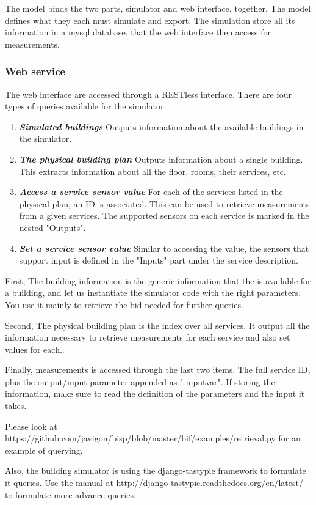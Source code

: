 \documentclass[10pt]{article}
\newcommand{\textdesc}[1]{\textit{\textbf{#1}}} %
\newcommand{\descitem}[1]{\item \textdesc{#1}}
\begin{document}
The model binds the two parts, simulator and web interface, together. The model defines what they
each must simulate and export. The simulation store all its information in a mysql database, that
the web interface then access for measurements. 

\subsubsection{Web service}

The web interface are accessed through a RESTless interface. There are four types of queries available for the simulator:

\begin{enumerate}
				\descitem{Simulated buildings} Outputs information about the available buildings in
				the simulator.
				\descitem{The physical building plan} Outputs information about a single building.
				This extracts information about all the floor, rooms, their services, etc. 
				\descitem{Access a service sensor value} For each of the services listed in the
				physical plan, an ID is associated. This can be used to retrieve measurements from a
				given services. The supported sensors on each service is marked in the nested
				"Outputs".
				\descitem{Set a service sensor value} Similar to accessing the value, the sensors
				that support input is defined in the "Inputs" part under the service description.
\end{enumerate}

First, The building information is the generic information that the is available for a building, and let us
instantiate the simulator code with the right parameters. You use it mainly to retrieve the bid
needed for further queries.

Second, The physical building plan is the index over all services. It output all the information necessary
to retrieve measurements for each service and also set values for each..

Finally, measurements is accessed through the last two items. The full service ID, plus the
output/input parameter appended as "-inputvar". If storing the information, make sure to read the
definition of the parameters and the input it takes.

Please look at https://github.com/javigon/bisp/blob/master/bif/examples/retrieval.py for an example
of querying.

Also, the building simulator is using the django-tastypie framework to formulate it queries. Use the
manual at http://django-tastypie.readthedocs.org/en/latest/ to formulate more advance queries.
\end{document}
